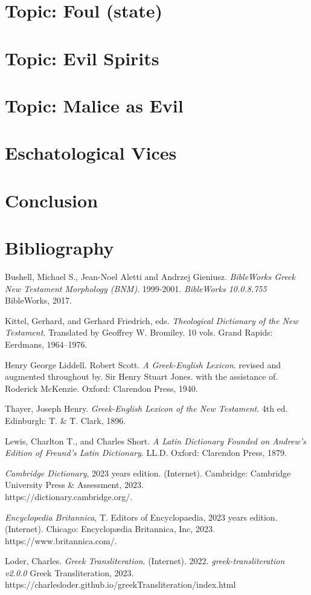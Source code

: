 \documentclass[a4paper,twocolumn,twoside,notitlepage,10pt]{article}
\begin{document}
\section{Topic: Foul (state)}
\section{Topic: Evil Spirits}
\section{Topic: Malice as Evil}
\section{Eschatological Vices}

\section{Conclusion}

\section{Bibliography}
\begin{description}
	\item Bushell, Michael S., Jean-Noel Aletti and Andrzej Gieniusz. \emph{BibleWorks Greek New Testament Morphology (BNM)}. 1999-2001. \emph{BibleWorks 10.0.8.755} BibleWorks, 2017.
	\item Kittel, Gerhard, and Gerhard Friedrich, eds. \emph{Theological Dictionary of the New Testament}. Translated by Geoffrey W. Bromiley. 10 vols. Grand Rapids: Eerdmans, 1964--1976.
	\item Henry George Liddell. Robert Scott.  \emph{A Greek-English Lexicon}. revised and augmented throughout by. Sir Henry Stuart Jones. with the assistance of. Roderick McKenzie. Oxford: Clarendon Press, 1940.
	\item Thayer, Joseph Henry. \emph{Greek-English Lexicon of the New Testament}. 4th ed. Edinburgh: T. \& T. Clark, 1896.
	\item Lewis, Charlton T., and Charles Short. \emph{A Latin Dictionary Founded on Andrew's Edition of Freund's Latin Dictionary}. LL.D. Oxford: Clarendon Press, 1879.
	\item \emph{Cambridge Dictionary}, 2023 years edition. (Internet). Cambridge: Cambridge University Press \& Assessment, 2023.\\ https://dictionary.cambridge.org/.
	\item \emph{Encyclopedia Britannica}, T. Editors of Encyclopaedia, 2023 years edition. (Internet). Chicago: Encyclopædia Britannica, Inc, 2023.\\https://www.britannica.com/.
	\item Loder, Charles. \emph{Greek Transliteration}. (Internet). 2022. \emph{greek-transliteration v2.0.0} Greek Transliteration, 2023.\\https://charlesloder.github.io/greekTransliteration/index.html
\end{description}
\end{document}
